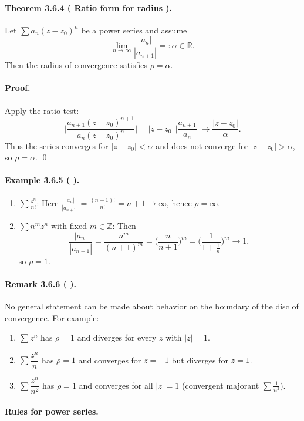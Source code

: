 \documentclass[12pt]{article}
\newcommand{\Z}{\mathbb{Z}}
\newcommand{\R}{\mathbb{R}}
\newcommand{\NumberedTheorem}[3]{%
\paragraph*{Theorem #1 ( #2 ).} #3\par}
\newcommand{\NumberedRemark}[3]{%
\paragraph*{Remark #1 ( #2 ).} #3\par}
\newcommand{\NumberedExample}[3]{%
\paragraph*{Example #1 ( #2 ).} #3\par}
\begin{document}
\NumberedTheorem{3.6.4}{Ratio form for radius}{Let $\sum a_n (z-z_0)^n$ be a power series and assume
\[
	\lim_{n\to\infty} \frac{|a_n|}{|a_{n+1}|} =: \alpha \in \overline{\R}.
\]
Then the radius of convergence satisfies $\rho = \alpha$.}
\paragraph{Proof.}
Apply the ratio test:
\[
	\Bigg|\frac{a_{n+1}(z-z_0)^{n+1}}{a_n (z-z_0)^n}\Bigg|
	 = |z-z_0|\, \Bigg|\frac{a_{n+1}}{a_n}\Bigg| \longrightarrow \frac{|z-z_0|}{\alpha}.
\]
Thus the series converges for $|z-z_0|<\alpha$ and does not converge for $|z-z_0|>\alpha$, so $\rho=\alpha$. \qed

\NumberedExample{3.6.5}{}{
\begin{enumerate}[label={(\arabic*)}, leftmargin=*]
	\item $\displaystyle \sum \frac{z^{n}}{n!}$: Here $\frac{|a_n|}{|a_{n+1}|} = \frac{(n+1)!}{n!} = n+1 \to \infty$, hence $\rho=\infty$.
	\item $\displaystyle \sum n^{m} z^{n}$ with fixed $m\in\Z$: Then
	\[
		\frac{|a_n|}{|a_{n+1}|} = \frac{n^{m}}{(n+1)^{m}} = \Big(\frac{n}{n+1}\Big)^{m} = \Big( \frac{1}{1+\tfrac{1}{n}} \Big)^{m} \longrightarrow 1,
	\]
	so $\rho=1$.
\end{enumerate}}

\NumberedRemark{3.6.6}{}{No general statement can be made about behavior on the boundary of the disc of convergence. For example:
\begin{enumerate}[label={(\arabic*)}, leftmargin=*]
	\item $\sum z^{n}$ has $\rho=1$ and diverges for every $z$ with $|z|=1$.
	\item $\sum \dfrac{z^{n}}{n}$ has $\rho=1$ and converges for $z=-1$ but diverges for $z=1$.
	\item $\sum \dfrac{z^{n}}{n^{2}}$ has $\rho=1$ and converges for all $|z|=1$ (convergent majorant $\sum \tfrac{1}{n^{2}}$).
\end{enumerate}}

\paragraph{Rules for power series.}
\end{document}

